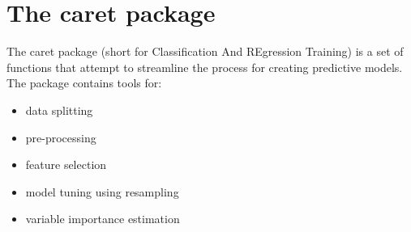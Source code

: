 \section{The caret package}

The caret package (short for Classification And REgression Training) is a set of functions that attempt to streamline the process for creating predictive models. The package contains tools for:

\begin{itemize}
\item data splitting
\item pre-processing
\item feature selection
\item model tuning using resampling
\item variable importance estimation
\end{itemize}


